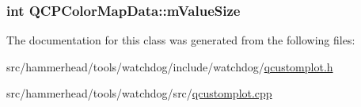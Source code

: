 \subsubsection[{\texorpdfstring{m\+Value\+Size}{mValueSize}}]{\setlength{\rightskip}{0pt plus 5cm}int Q\+C\+P\+Color\+Map\+Data\+::m\+Value\+Size\hspace{0.3cm}{\ttfamily [protected]}}\hypertarget{classQCPColorMapData_ae8ee9093632a59f55eb4fc06579ed256}{}\label{classQCPColorMapData_ae8ee9093632a59f55eb4fc06579ed256}


The documentation for this class was generated from the following files\+:\begin{DoxyCompactItemize}
\item 
src/hammerhead/tools/watchdog/include/watchdog/\hyperlink{qcustomplot_8h}{qcustomplot.\+h}\item 
src/hammerhead/tools/watchdog/src/\hyperlink{qcustomplot_8cpp}{qcustomplot.\+cpp}\end{DoxyCompactItemize}
